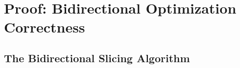 
\section{Proof: Bidirectional Optimization Correctness}
\label{appendix:BidirectionalProof}

%
%
%
%
%

\subsection{The Bidirectional Slicing Algorithm}

